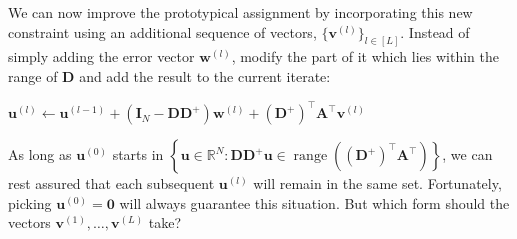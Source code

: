 We can now improve the prototypical assignment by incorporating this new constraint using an additional sequence of vectors, $\{\mathbf{v}^{(l)}\}_{l \in [L]}$. Instead of simply adding the error vector $\mathbf{w}^{(l)}$, modify the part of it which lies within the range of $\mathbf{D}$ and add the result to the current iterate:
\begin{algorithm}[H]
    \begin{algorithmic}[1]
        \State{$\ldots$}
        \State $\mathbf{u}^{(l)} \gets \mathbf{u}^{(l-1)} + \left ( \mathbf{I}_N - \mathbf{D} \mathbf{D}^{+}\right ) \mathbf{w}^{(l)} + (\mathbf{D}^{+})^{\top}\mathbf{A}^{\top} \mathbf{v}^{(l)}$
        \State{$\ldots$}
    \end{algorithmic}
\end{algorithm}

As long as $\mathbf{u}^{(0)}$ starts in $\left\{\mathbf{u} \in \mathbb{R}^{N} : \mathbf{D} \mathbf{D}^{+}\mathbf{u} \in \operatorname{range} \left ( (\mathbf{D}^{+})^{\top}\mathbf{A^{\top}} \right ) \right\}$, we can rest assured that each subsequent $\mathbf{u}^{(l)}$ will remain in the same set. Fortunately, picking $\mathbf{u}^{(0)} = \mathbf{0}$ will always guarantee this situation. But which form should the vectors $\mathbf{v}^{(1)}, \dots, \mathbf{v}^{(L)}$ take?

